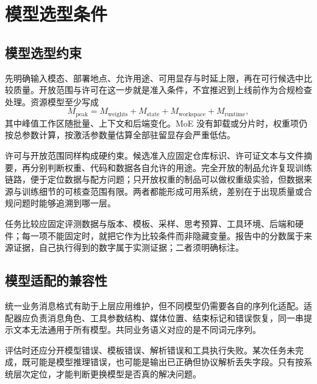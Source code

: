 \documentclass[../textbook.tex]{subfiles}
\begin{document}
\section{模型选型条件}

\subsection{模型选型约束}
先明确输入模态、部署地点、允许用途、可用显存与时延上限，再在可行候选中比较质量。开放范围与许可在这一步就是准入条件，不宜推迟到上线前作为合规检查处理。资源模型至少写成
\begin{equation}
 M_{\mathrm{peak}}=M_{\mathrm{weights}}+M_{\mathrm{state}}+
 M_{\mathrm{workspace}}+M_{\mathrm{runtime}},
\end{equation}
其中峰值工作区随批量、上下文和后端变化。MoE 没有卸载或分片时，权重项仍按总参数计算，按激活参数量估算全部驻留显存会严重低估。

许可与开放范围同样构成硬约束。候选准入应固定仓库标识、许可证文本与文件摘要，再分别判断权重、代码和数据各自允许的用途。完全开放的制品允许复现训练链路，便于定位数据与配方问题；只开放权重的制品可以做权重级实验，但数据来源与训练细节的可核查范围有限。两者都能形成可用系统，差别在于出现质量或合规问题时能够追溯到哪一层。

任务比较应固定评测数据与版本、模板、采样、思考预算、工具环境、后端和硬件；每一项不能固定时，就把它作为比较条件而非隐藏变量。报告中的分数属于来源证据，自己执行得到的数字属于实测证据；二者须明确标注。

\subsection{模型适配的兼容性}
统一业务消息格式有助于上层应用维护，但不同模型仍需要各自的序列化适配。适配器应负责消息角色、工具参数结构、媒体位置、结束标记和错误恢复，同一串提示文本无法通用于所有模型。共同业务语义对应的是不同词元序列。

评估时还应分开模型错误、模板错误、解析错误和工具执行失败。某次任务未完成，既可能是模型推理错误，也可能是输出已正确但协议解析丢失字段。只有按系统层次定位，才能判断更换模型是否真的解决问题。





\chapterreferences
\myendchapterdocument
\end{document}
